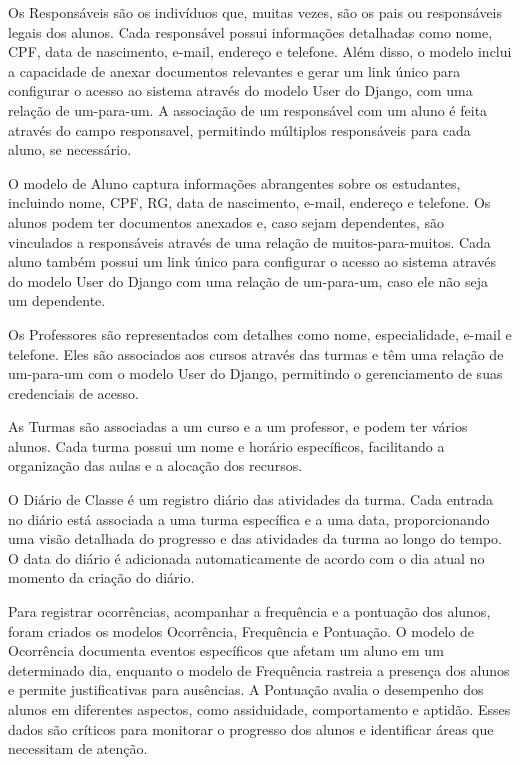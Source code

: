 Os Responsáveis são os indivíduos que, muitas vezes, são os pais ou responsáveis legais dos alunos. Cada responsável possui informações detalhadas como nome, CPF, data de nascimento, e-mail, endereço e telefone. Além disso, o modelo inclui a capacidade de anexar documentos relevantes e gerar um link único para configurar o acesso ao sistema através do modelo User do Django, com uma relação de um-para-um. A associação de um responsável com um aluno é feita através do campo responsavel, permitindo múltiplos responsáveis para cada aluno, se necessário.

O modelo de Aluno captura informações abrangentes sobre os estudantes, incluindo nome, CPF, RG, data de nascimento, e-mail, endereço e telefone. Os alunos podem ter documentos anexados e, caso sejam dependentes, são vinculados a responsáveis através de uma relação de muitos-para-muitos. Cada aluno também possui um link único para configurar o acesso ao sistema através do modelo User do Django com uma relação de um-para-um, caso ele não seja um dependente.

Os Professores são representados com detalhes como nome, especialidade, e-mail e telefone. Eles são associados aos cursos através das turmas e têm uma relação de um-para-um com o modelo User do Django, permitindo o gerenciamento de suas credenciais de acesso.

As Turmas são associadas a um curso e a um professor, e podem ter vários alunos. Cada turma possui um nome e horário específicos, facilitando a organização das aulas e a alocação dos recursos.

O Diário de Classe é um registro diário das atividades da turma. Cada entrada no diário está associada a uma turma específica e a uma data, proporcionando uma visão detalhada do progresso e das atividades da turma ao longo do tempo. O data do diário é adicionada automaticamente de acordo com o dia atual no momento da criação do diário.

Para registrar ocorrências, acompanhar a frequência e a pontuação dos alunos, foram criados os modelos Ocorrência, Frequência e Pontuação. O modelo de Ocorrência documenta eventos específicos que afetam um aluno em um determinado dia, enquanto o modelo de Frequência rastreia a presença dos alunos e permite justificativas para ausências. A Pontuação avalia o desempenho dos alunos em diferentes aspectos, como assiduidade, comportamento e aptidão. Esses dados são críticos para monitorar o progresso dos alunos e identificar áreas que necessitam de atenção.

